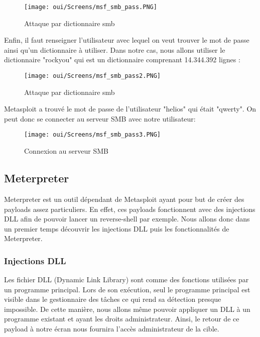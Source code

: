 \begin{figure}[htp!]
  \centering
  \setlength\figureheight{7cm}
  \setlength\figurewidth{9cm}
  \texttt{[image: oui/Screens/msf\_smb\_pass.PNG]}
  \caption{Attaque par dictionnaire smb}
  \label{fig:courbe-tikz}
\end{figure}
Enfin, il faut renseigner l'utilisateur avec lequel on veut trouver le mot de passe ainsi qu'un dictionnaire à utiliser. Dans notre cas, nous allons utiliser le dictionnaire "rockyou" qui est un dictionnaire comprenant 14.344.392 lignes :

\begin{figure}[htp!]
  \centering
  \setlength\figureheight{7cm}
  \setlength\figurewidth{9cm}
  \texttt{[image: oui/Screens/msf\_smb\_pass2.PNG]}
  \caption{Attaque par dictionnaire smb}
  \label{fig:courbe-tikz}
\end{figure}

Metasploit a trouvé le mot de passe de l'utilisateur "helios" qui était "qwerty". On peut donc se connecter au serveur SMB avec notre utilisateur:

\begin{figure}[htp!]
  \centering
  \setlength\figureheight{7cm}
  \setlength\figurewidth{9cm}
  \texttt{[image: oui/Screens/msf\_smb\_pass3.PNG]}
  \caption{Connexion au serveur SMB}
  \label{fig:courbe-tikz}
\end{figure}

\subsection{Meterpreter}

Meterpreter est un outil dépendant de Metasploit ayant pour but de créer des payloads assez particuliers. En effet, ces payloads fonctionnent avec des injections DLL afin de pouvoir lancer un reverse-shell par exemple. Nous allons donc dans un premier temps découvrir les injections DLL puis les fonctionnalités de Meterpreter.

\subsubsection{Injections DLL}

Les fichier DLL (Dynamic Link Library) sont comme des fonctions utilisées par un programme principal. Lors de son exécution, seul le programme principal est visible dans le gestionnaire des tâches ce qui rend sa détection presque impossible. De cette manière, nous allons même pouvoir appliquer un DLL à un programme existant et ayant les droits administrateur. Ainsi, le retour de ce payload à notre écran nous fournira l'accès administrateur de la cible. 

